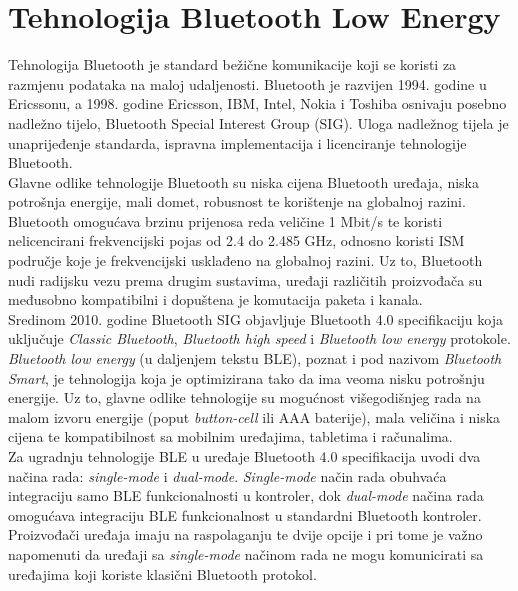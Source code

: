 \chapter{Tehnologija Bluetooth Low Energy}
\label{chap:ble}
    
Tehnologija Bluetooth je standard bežične komunikacije koji se koristi za razmjenu podataka na maloj udaljenosti. 
Bluetooth je razvijen 1994. godine u Ericssonu, a 1998. godine Ericsson, IBM, Intel, Nokia i Toshiba osnivaju posebno nadležno tijelo, Bluetooth Special Interest Group (SIG). 
Uloga nadležnog tijela je unaprijeđenje standarda, ispravna implementacija i licenciranje tehnologije Bluetooth.
\\

Glavne odlike tehnologije Bluetooth su niska cijena Bluetooth uređaja, niska potrošnja energije, mali domet, robusnost te korištenje na globalnoj razini. 
Bluetooth omogućava brzinu prijenosa reda veličine 1 Mbit/s te koristi nelicencirani frekvencijski pojas od 2.4 do 2.485 GHz, odnosno koristi ISM područje  koje je frekvencijski usklađeno na globalnoj razini. 
Uz to, Bluetooth nudi radijsku vezu prema drugim sustavima, uređaji različitih proizvođača su međusobno kompatibilni i dopuštena je komutacija paketa i kanala.
\\%

Sredinom 2010. godine Bluetooth SIG objavljuje Bluetooth 4.0 specifikaciju koja uključuje \textit{Classic Bluetooth}, \textit{Bluetooth high speed} i \textit{Bluetooth low energy} protokole. 
\textit{Bluetooth low energy} (u daljenjem tekstu BLE), poznat i pod nazivom \textit{Bluetooth Smart}, je tehnologija koja je optimizirana tako da ima veoma nisku potrošnju energije. 
Uz to, glavne odlike tehnologije su mogućnost višegodišnjeg rada na malom izvoru energije (poput \textit{button-cell} ili AAA baterije), mala veličina i niska cijena te kompatibilnost sa mobilnim uređajima, tabletima i računalima. 
\\
Za ugradnju tehnologije BLE u uređaje Bluetooth 4.0 specifikacija uvodi dva načina rada: \textit{single-mode} i \textit{dual-mode}. 
\textit{Single-mode} način rada obuhvaća integraciju samo BLE funkcionalnosti u kontroler, dok \textit{dual-mode} načina rada omogućava integraciju BLE funkcionalnost u standardni Bluetooth kontroler. 
Proizvođači uređaja imaju na raspolaganju te dvije opcije i pri tome je važno napomenuti da uređaji sa \textit{single-mode} načinom rada ne mogu komunicirati sa uređajima koji koriste klasični Bluetooth protokol.
\\

